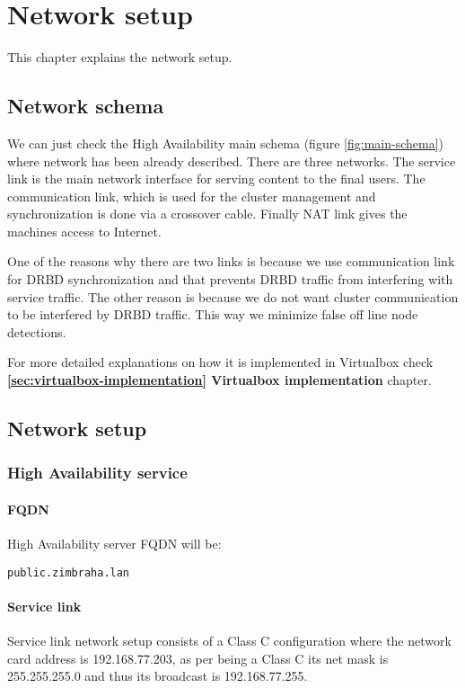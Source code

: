 

\chapter{Network setup}
\label{chap:network-setup}
This chapter explains the network setup.

\section {Network schema}
We can just check the High Availability main schema (figure \ref{fig:main-schema}) where network has been already described. There are three networks. The service link is the main network interface for serving content to the final users. The communication link, which is used for the cluster management and synchronization is done via a crossover cable. Finally NAT link gives the machines access to Internet.

One of the reasons why there are two links is because we use communication link for DRBD synchronization and that prevents DRBD traffic from interfering with service traffic. The other reason is because we do not want cluster communication to be interfered by DRBD traffic. This way we minimize false off line node detections.

For more detailed explanations on how it is implemented in Virtualbox check \textbf{\ref{sec:virtualbox-implementation} Virtualbox implementation} chapter.

\section {Network setup}

\subsection {High Availability service}
\subsubsection {FQDN}
High Availability server FQDN will be:
\begin{verbatim}
public.zimbraha.lan
\end{verbatim}

\subsubsection {Service link}
Service link network setup consists of a Class C configuration where the network card address is 192.168.77.203, as per being a Class C its net mask is 255.255.255.0 and thus its broadcast is 192.168.77.255.

